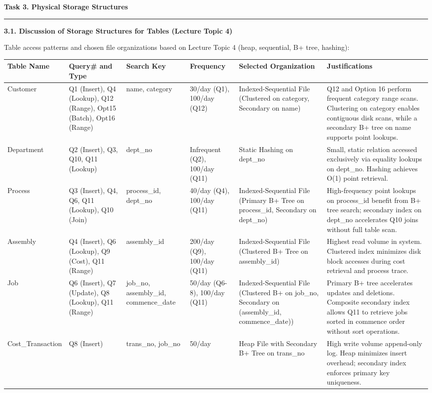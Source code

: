 \documentclass[10pt,letterpaper]{article}
\newcommand{\mysection}[1]{%
    \vspace{6pt}%
    {\large\bfseries\color{titlecolor} #1}\par
    \vspace{-4pt}\rule{\textwidth}{0.6pt}\vspace{4pt}%
}
\newcommand{\mysubsection}[1]{%
    \vspace{4pt}%
    {\normalsize\bfseries\color{titlecolor} #1}\par\vspace{2pt}%
}
\begin{document}
\newpage
{}\label{sec:task3}
\mysection{Task 3. Physical Storage Structures}
\label{sec:task3_1}
\mysubsection{3.1. Discussion of Storage Structures for Tables (Lecture Topic 4)}
\noindent Table access patterns and chosen file organizations based on Lecture Topic 4 (heap, sequential, B+ tree, hashing):\\[0.2cm]
\begin{table}[H]
\centering\scriptsize
\renewcommand{\arraystretch}{1.2}
\begin{tabularx}{\textwidth}{p{2.0cm}p{2.2cm}p{1.8cm}p{1.5cm}p{2.5cm}X}
\toprule
\textbf{Table Name} & \textbf{Query\# and Type} & \textbf{Search Key} & \textbf{Frequency} & \textbf{Selected Organization} & \textbf{Justifications} \\
\midrule
Customer & Q1 (Insert), Q4 (Lookup), Q12 (Range), Opt15 (Batch), Opt16 (Range) & name, category & 30/day (Q1), 100/day (Q12) & Indexed-Sequential File (Clustered on category, Secondary on name) & Q12 and Option 16 perform frequent category range scans. Clustering on category enables contiguous disk scans, while a secondary B+ tree on name supports point lookups. \\
\midrule
Department & Q2 (Insert), Q3, Q10, Q11 (Lookup) & dept\_no & Infrequent (Q2), 100/day (Q11) & Static Hashing on dept\_no & Small, static relation accessed exclusively via equality lookups on dept\_no. Hashing achieves O(1) point retrieval. \\
\midrule
Process & Q3 (Insert), Q4, Q6, Q11 (Lookup), Q10 (Join) & process\_id, dept\_no & 40/day (Q4), 100/day (Q11) & Indexed-Sequential File (Primary B+ Tree on process\_id, Secondary on dept\_no) & High-frequency point lookups on process\_id benefit from B+ tree search; secondary index on dept\_no accelerates Q10 joins without full table scan. \\
\midrule
Assembly & Q4 (Insert), Q6 (Lookup), Q9 (Cost), Q11 (Range) & assembly\_id & 200/day (Q9), 100/day (Q11) & Indexed-Sequential File (Clustered B+ Tree on assembly\_id) & Highest read volume in system. Clustered index minimizes disk block accesses during cost retrieval and process trace. \\
\midrule
Job & Q6 (Insert), Q7 (Update), Q8 (Lookup), Q11 (Range) & job\_no, assembly\_id, commence\_date & 50/day (Q6-8), 100/day (Q11) & Indexed-Sequential File (Clustered B+ on job\_no, Secondary on (assembly\_id, commence\_date)) & Primary B+ tree accelerates updates and deletions. Composite secondary index allows Q11 to retrieve jobs sorted in commence order without sort operations. \\
\midrule
Cost\_Transaction & Q8 (Insert) & trans\_no, job\_no & 50/day & Heap File with Secondary B+ Tree on trans\_no & High write volume append-only log. Heap minimizes insert overhead; secondary index enforces primary key uniqueness. \\
\bottomrule
\end{tabularx}
\end{table}
\end{document}
